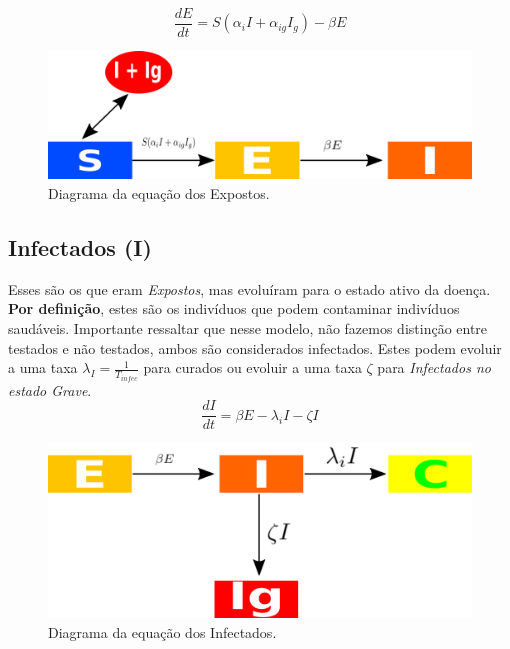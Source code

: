 \documentclass[12pt,a4papper]{article}
\begin{document}
\begin{equation}
	\frac{dE}{dt}= S(\alpha_i I +\alpha_{ig}I_g) - \beta E
\end{equation}
\begin{figure}[!h]
	\centering
	\includegraphics[scale=0.4]{covidE}
	\caption{Diagrama da equação dos Expostos.}
	\label{fig:universe}
\end{figure}

\subsection{Infectados (I)}
Esses são os que eram \textit{Expostos}, mas evoluíram para o estado ativo da doença. \textbf{Por definição}, estes são os indivíduos que podem contaminar indivíduos saudáveis. Importante ressaltar que nesse modelo, não fazemos distinção entre testados e não testados, ambos são considerados infectados. Estes podem evoluir a uma taxa $\lambda_I=\frac{1}{T_{infec}}$ para curados ou evoluir a uma taxa $\zeta$ para \textit{Infectados no estado Grave}.
\begin{equation}
	\frac{dI}{dt}= \beta E -\lambda_i I - \zeta I
\end{equation}
\begin{figure}[!h]
	\centering
	\includegraphics[scale=0.4]{covidI}
	\caption{Diagrama da equação dos Infectados.}
	\label{fig:universe}
\end{figure}
\end{document}
